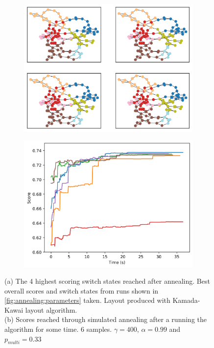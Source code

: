 \begin{figure}[H]
    \begin{subfigure}{.5\textwidth}
      \centering
      \includegraphics[width=\linewidth]{img/switchstate_exploring/suburb2/annealing_sampling/best_overall.png}
      \caption{
       }
      \label{fig:annealing:topologies}
    \end{subfigure}%
    \begin{subfigure}{.5\textwidth}
      \centering
      \includegraphics[width=\linewidth]{img/switchstate_exploring/suburb2/annealing_sampling/over_time.png}
      \caption{
      }
      \label{fig:annealing:over_time}
    \end{subfigure}
    \caption{
        (a) The 4 highest scoring switch states reached after annealing. Best overall
        scores and switch states from runs shown in \autoref{fig:annealing:parameters} taken.
        Layout produced with
        Kamada-Kawai layout algorithm\autocite{kamada_kawai}.\\
        (b) Scores reached through simulated annealing after a running the
        algorithm for some time. 6 samples. $\gamma = 400$, $\alpha = 0.99$ and $p_{multi} = 0.33$
    }
\end{figure}


    

